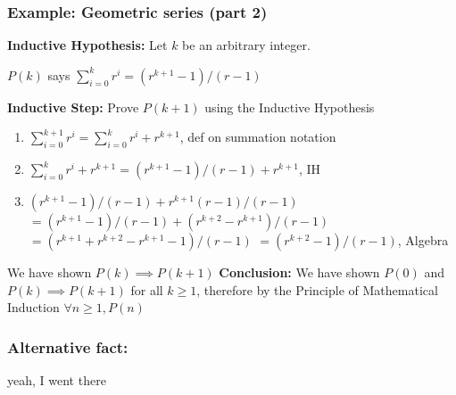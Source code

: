 \begin{frame}
  \frametitle{Example: Geometric series (part 2)}

  \textbf{Inductive Hypothesis:} Let $k$ be an arbitrary integer.

  $P(k)$ says $\sum_{i=0}^k r^i = (r^{k+1} - 1) / (r - 1)$
  \pause

  \textbf{Inductive Step:} Prove $P(k+1)$ using the Inductive Hypothesis
  \pause

  \begin{enumerate}
  \item $\sum_{i=0}^{k+1} r^i = \sum_{i=0}^k r^i + r^{k+1}$, def on summation notation 
    \pause
  \item $\sum_{i=0}^k r^i + r^{k+1} = (r^{k+1} - 1) / (r - 1) + r^{k+1}$, IH
  \item $(r^{k+1} - 1) / (r - 1) + r^{k+1} (r-1) / (r-1)$
    \pause
    $= (r^{k+1} - 1) / (r - 1) + (r^{k+2}-r^{k+1}) / (r-1)$
    \pause
    $= (r^{k+1} + r^{k+2} - r^{k+1} - 1) / (r-1)$
    $= (r^{k+2} - 1) / (r-1)$, Algebra
  \end{enumerate}
  \pause
  We have shown $P(k) \implies P(k+1)$
  \pause
  \textbf{Conclusion:} We have shown $P(0)$ and $P(k) \implies P(k+1)$ for all $k \geq 1$, therefore by the Principle of Mathematical Induction $\forall n \geq 1, P(n)$
  
\end{frame}

\begin{frame}
  \frametitle{Alternative fact:}
  \pause
  {\large yeah, I went there}
\end{frame}

